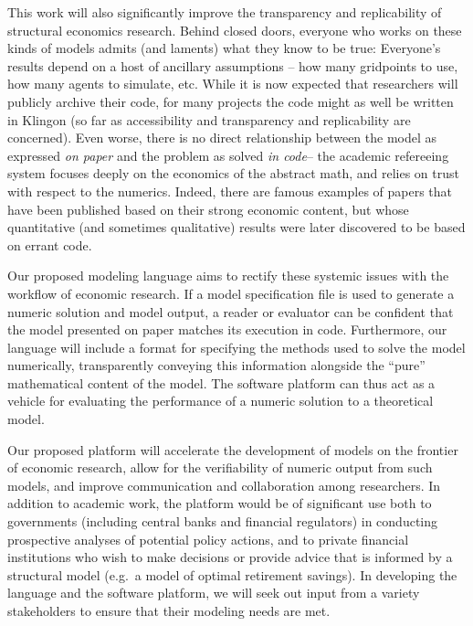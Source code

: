 \documentclass[11pt,pdftex,letterpaper]{article}
\begin{document}
This work will also significantly improve the transparency and replicability of structural economics research. Behind closed doors, everyone who works on these kinds of models admits (and laments) what they know to be true: Everyone's results depend on a host of ancillary assumptions -- how many gridpoints to use, how many agents to simulate, etc.  While it is now expected that researchers will publicly archive their code, for many projects the code might as well be written in Klingon (so far as accessibility and transparency and replicability are concerned).  Even worse, there is no direct relationship between the model as expressed \textit{on paper} and the problem as solved \textit{in code}-- the academic refereeing system focuses deeply on the economics of the abstract math, and relies on trust with respect to the numerics. Indeed, there are famous examples of papers that have been published based on their strong economic content, but whose quantitative (and sometimes qualitative) results were later discovered to be based on errant code.






Our proposed modeling language aims to rectify these systemic issues with the workflow of economic research. If a model specification file is used to generate a numeric solution and model output, a reader or evaluator can be confident that the model presented on paper matches its execution in code. Furthermore, our language will include a format for specifying the methods used to solve the model numerically, transparently conveying this information alongside the ``pure'' mathematical content of the model. The software platform can thus act as a vehicle for evaluating the performance of a numeric solution to a theoretical model.

Our proposed platform will accelerate the development of models on the frontier of economic research, allow for the verifiability of numeric output from such models, and improve communication and collaboration among researchers. In addition to academic work, the platform would be of significant use both to governments (including central banks and financial regulators) in conducting prospective analyses of potential policy actions, and to private financial institutions who wish to make decisions or provide advice that is informed by a structural model (e.g.\ a model of optimal retirement savings). In developing the language and the software platform, we will seek out input from a variety stakeholders to ensure that their modeling needs are met.
\end{document}
